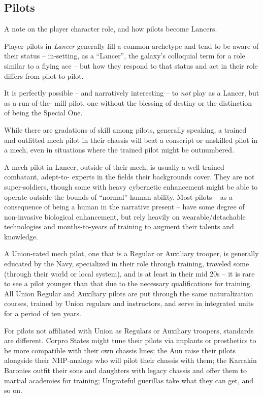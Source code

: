 \subsection{Pilots}

A note on the player character role, and how pilots become Lancers.

Player pilots in \textit{Lancer} generally fill a common archetype and tend to be aware of their status --
in-setting, as a ``Lancer'', the galaxy's colloquial term for a role similar to a flying ace --  but how
they respond to that status and act in their role differs from pilot to pilot.

It is perfectly possible -- and narratively interesting -- to \textit{not} play as a Lancer, but as a run-of-the-
mill pilot, one without the blessing of destiny or the distinction of being the Special One.

While there are gradations of skill among pilots, generally speaking, a trained and outfitted mech
pilot in their chassis will beat a conscript or unskilled pilot in a mech, even in situations where the
trained pilot might be outnumbered.

A mech pilot in Lancer, outside of their mech, is usually a well-trained combatant, adept-to-
experts in the fields their backgrounds cover. They are not super-soldiers, though some with
heavy cybernetic enhancement might be able to operate outside the bounds of ``normal'' human
ability. Most pilots -- as a consequence of being a human in the narrative present -- have some
degree of non-invasive biological enhancement, but rely heavily on wearable/detachable
technologies and months-to-years of training to augment their talents and knowledge.

A Union-rated mech pilot, one that is a Regular or Auxiliary trooper, is generally educated by the
Navy, specialized in their role through training, traveled some (through their world or local
system), and is at least in their mid 20s -- it is rare to see a pilot younger than that due to the
necessary qualifications for training. All Union Regular and Auxiliary pilots are put through the
same naturalization courses, trained by Union regulars and instructors, and serve in integrated
units for a period of ten years.

For pilots not affiliated with Union as Regulars or Auxiliary troopers, standards are different.
Corpro States might tune their pilots via implants or prosthetics to be more compatible with their
own chassis lines; the Aun raise their pilots alongside their NHP-analogs who will pilot their
chassis with them; the Karrakin Baronies outfit their sons and daughters with legacy chassis and
offer them to martial academies for training; Ungrateful guerillas take what they can get, and so
on.

